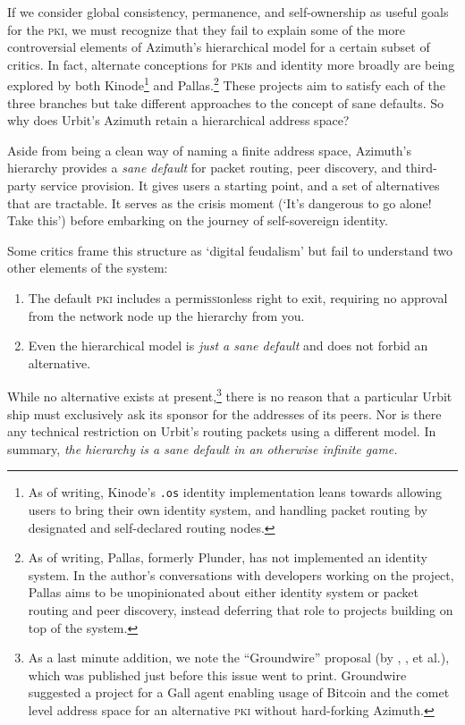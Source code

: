 \documentclass[twoside]{article}
\begin{document}
If we consider global consistency, permanence, and self-ownership as useful goals for the \textsc{pki}, we must recognize that they fail to explain some of the more controversial elements of Azimuth's hierarchical model for a certain subset of critics. In fact, alternate conceptions for \textsc{pki}s and identity more broadly are being explored by both Kinode\footnote{As of writing, Kinode's \texttt{.os} identity implementation leans towards allowing users to bring their own identity system, and handling packet routing by designated and self-declared routing nodes.} and Pallas.\footnote{As of writing, Pallas, formerly Plunder, has not implemented an identity system.  In the author's conversations with developers working on the project, Pallas aims to be unopinionated about either identity system or packet routing and peer discovery, instead deferring that role to projects building on top of the system.} These projects aim to satisfy each of the three branches but take different approaches to the concept of sane defaults. So why does Urbit's Azimuth retain a hierarchical address space?

Aside from being a clean way of naming a finite address space, Azimuth's hierarchy provides a \emph{sane default} for packet routing, peer discovery, and third-party service provision. It gives users a starting point, and a set of alternatives that are tractable. It serves as the crisis moment (`It's dangerous to go alone! Take this') before embarking on the journey of self-sovereign identity.

Some critics frame this structure as `digital feudalism' but fail to understand two other elements of the system:
\begin{enumerate}
  \item  The default \textsc{pki} includes a permi\textsc{ssi}onless right to exit, requiring no approval from the network node up the hierarchy from you.
  \item  Even the hierarchical model is \emph{just a sane default} and does not forbid an alternative.
\end{enumerate}

\noindent
While no alternative exists at present,\footnote{As a last minute addition, we note the ``Groundwire'' proposal (by , , et al.), which was published just before this issue went to print. Groundwire suggested a project for a Gall agent enabling usage of Bitcoin and the comet level address space for an alternative \textsc{pki} without hard-forking Azimuth.} there is no reason that a particular Urbit ship must exclusively ask its sponsor for the addresses of its peers. Nor is there any technical restriction on Urbit's routing packets using a different model. In summary, \emph{the hierarchy is a sane default in an otherwise infinite game.}
\end{document}
